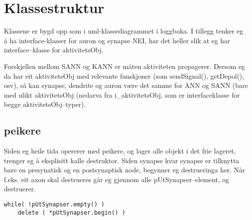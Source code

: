 
\section{Klassestruktur}
Klassene er bygd opp som i uml-klassediagrammet i loggboka. I tillegg tenker eg å ha interface-klasser for auron og synapse
NEI, har det heller slik at eg har interface--klasse for aktivitetsObj.

Forskjellen mellom SANN og KANN er måten aktiviteten propagerer. Dersom eg da har eit aktivitetsObj med relevante funskjoner (som sendSignal(), getDepol(), osv), så kan synapse, dendrite og auron være det samme for ANN og SANN (bare med ulikt aktivitetsObj (nedarva fra i\_aktivitetsObj, som er interfaceklasse for begge aktivitetsObj--typer).

\subsection{peikere}
Siden eg heile tida opererer med peikere, og lager alle objekt i det frie lageret, trenger eg å eksplisitt kalle destruktor.
Siden synapse kvar synapse er tilknytta bare en presynatisk og en postsynaptisk node, begynner eg destrueringa her. Når f.eks. eit axon skal destrueres går eg gjennom alle pUtSynapser--element, og destruerer.
\begin{lstlisting}
while( !pUtSynapser.empty() )
	delete ( *pUtSynapser.begin() )
\end{lstlisting}
